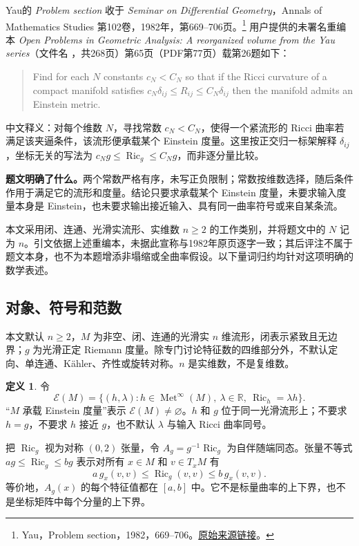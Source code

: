 \documentclass[11pt,a4paper]{article}
\theoremstyle{definition}
\newtheorem{definition}{定义}[section]
\newcommand{\Ric}{\operatorname{Ric}}
\newcommand{\Met}{\operatorname{Met}}
\newcommand{\Ein}{\mathcal E}
\newcommand{\src}[3]{\footnote{\raggedright #1，#2。\href{#3}{原始来源链接}。}}
\begin{document}
Yau的 \emph{Problem section} 收于 \emph{Seminar on Differential Geometry}，Annals of Mathematics Studies 第102卷，1982年，第669--706页。\src{Yau}{Problem section，1982，669--706}{https://doi.org/10.1515/9781400881918-035}
用户提供的未署名重编本 \emph{Open Problems in Geometric Analysis: A reorganized volume from the Yau series}（文件名 ，共268页）第65页（PDF第77页）载第26题如下：
\begin{quote}
Find for each $N$ constants $c_N<C_N$ so that if the Ricci curvature of a compact manifold satisfies $c_N\delta_{ij}\le R_{ij}\le C_N\delta_{ij}$ then the manifold admits an Einstein metric.
\end{quote}
中文释义：对每个维数 $N$，寻找常数 $c_N<C_N$，使得一个紧流形的 Ricci 曲率若满足该夹逼条件，该流形便承载某个 Einstein 度量。这里按正交归一标架解释 $\delta_{ij}$，坐标无关的写法为 $c_Ng\le\Ric_g\le C_Ng$，而非逐分量比较。

\textbf{题文明确了什么。}两个常数严格有序，未写正负限制；常数按维数选择，随后条件作用于满足它的流形和度量。结论只要求承载某个 Einstein 度量，未要求输入度量本身是 Einstein，也未要求输出接近输入、具有同一曲率符号或来自某条流。

本文采用闭、连通、光滑实流形、实维数 $n\ge2$ 的工作类别，并将题文中的 $N$ 记为 $n$。引文依据上述重编本，未据此宣称与1982年原页逐字一致；其后评注不属于题文本身，也不为本题增添非塌缩或全曲率假设。以下量词归约均针对这项明确的数学表述。

\subsection{对象、符号和范数}

本文默认 $n\ge2$，$M$ 为非空、闭、连通的光滑实 $n$ 维流形，闭表示紧致且无边界；$g$ 为光滑正定 Riemann 度量。除专门讨论特征数的四维部分外，不默认定向、单连通、Kähler、齐性或旋转对称。$n$ 是实维数，不是复维数。

\begin{definition}
令
\[
\Ein(M)=\{(h,\lambda):h\in\Met^\infty(M),\ \lambda\in\mathbb R,
\ \Ric_h=\lambda h\}.
\]
“$M$ 承载 Einstein 度量”表示 $\Ein(M)\ne\varnothing$。$h$ 和 $g$ 位于同一光滑流形上；不要求 $h=g$，不要求 $h$ 接近 $g$，也不默认 $\lambda$ 与输入 Ricci 曲率同号。
\end{definition}

把 $\Ric_g$ 视为对称 $(0,2)$ 张量，令 $A_g=g^{-1}\Ric_g$ 为自伴随端同态。张量不等式 $ag\le\Ric_g\le bg$ 表示对所有 $x\in M$ 和 $v\in T_xM$ 有
\[
a\,g_x(v,v)\le\Ric_g(v,v)\le b\,g_x(v,v).
\]
等价地，$A_g(x)$ 的每个特征值都在 $[a,b]$ 中。它不是标量曲率的上下界，也不是坐标矩阵中每个分量的上下界。
\end{document}
